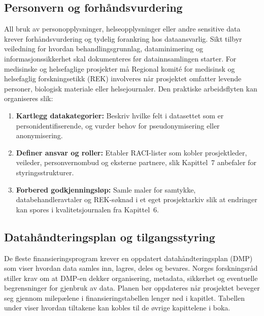 \subsection{Personvern og forhåndsvurdering}
All bruk av personopplysninger, helseopplysninger eller andre sensitive data krever forhåndsvurdering og tydelig forankring hos dataansvarlig. Sikt tilbyr veiledning for hvordan behandlingsgrunnlag, dataminimering og informasjonssikkerhet skal dokumenteres før datainnsamlingen starter.\citep{sikt2023personvern} For medisinske og helsefaglige prosjekter må Regional komité for medisinsk og helsefaglig forskningsetikk (REK) involveres når prosjektet omfatter levende personer, biologisk materiale eller helsejournaler.\citep{rek2024forhandsvurdering} Den praktiske arbeidsflyten kan organiseres slik:
\begin{enumerate}
    \item \textbf{Kartlegg datakategorier:} Beskriv hvilke felt i datasettet som er personidentifiserende, og vurder behov for pseudonymisering eller anonymisering.
    \item \textbf{Definer ansvar og roller:} Etabler RACI-lister som kobler prosjektleder, veileder, personvernombud og eksterne partnere, slik Kapittel~7 anbefaler for styringsstrukturer.
    \item \textbf{Forbered godkjenningsløp:} Samle maler for samtykke, databehandleravtaler og REK-søknad i et eget prosjektarkiv slik at endringer kan spores i kvalitetsjournalen fra Kapittel~6.
\end{enumerate}

\subsection{Datahåndteringsplan og tilgangsstyring}
De fleste finansieringsprogram krever en oppdatert datahåndteringsplan (DMP) som viser hvordan data samles inn, lagres, deles og bevares. Norges forskningsråd stiller krav om at DMP-en dekker organisering, metadata, sikkerhet og eventuelle begrensninger for gjenbruk av data.\citep{forskningsradet2023aapen} Planen bør oppdateres når prosjektet beveger seg gjennom milepælene i finansieringstabellen lenger ned i kapitlet. Tabellen under viser hvordan tiltakene kan kobles til de øvrige kapittelene i boka.

